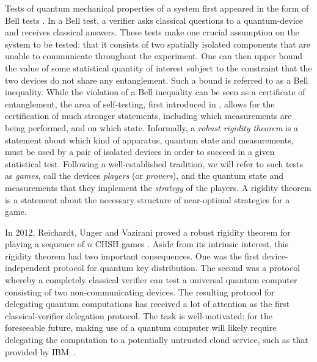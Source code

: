 \documentclass{toc}
\begin{document}
Tests of quantum mechanical properties of a system first appeared in the form of Bell tests \cite{Bell:64a,Clauser:69a}. In a Bell test, a verifier asks classical questions to a quantum-device and receives classical answers. These tests make one crucial assumption on the system to be tested: that it consists of two spatially isolated components that are unable to communicate throughout the experiment. One can then upper bound the value of some statistical quantity of interest subject to the constraint that the two devices do not share any entanglement. Such a bound is referred to as a Bell inequality. While the violation of a Bell inequality can be seen as a certificate of entanglement, the area of self-testing, first introduced in \cite{mayers2004selftesting}, allows for the certification of much stronger statements, including  which measurements are being performed, and on which state.  Informally, a \emph{robust rigidity theorem} is a statement about which kind of apparatus, quantum state and measurements, must be used by a pair of isolated devices in order to succeed in a given statistical test. Following a well-established tradition, we will refer to such tests as \emph{games}, call the devices \emph{players} (or \emph{provers}), and the quantum state and measurements that they implement the \emph{strategy} of the players. A rigidity theorem is a statement about the necessary structure of near-optimal strategies for a game.  

In 2012, Reichardt, Unger and Vazirani proved a robust rigidity theorem for
playing a sequence of $n$ CHSH games \cite{reichardt2012classical}. Aside from
its intrinsic interest, this rigidity theorem had two important consequences.
One was the first device-independent protocol for quantum key distribution. The
second was a protocol whereby a completely classical verifier can test a
universal quantum computer consisting of two non-communicating devices.  The resulting
 protocol for delegating quantum
computations has received a lot of attention as the first classical-verifier delegation protocol. 
The task is well-motivated: for the foreseeable future, making use of a quantum computer will likely require delegating the computation to a potentially untrusted cloud service, such as that provided by IBM~\cite{ibmcloud}.  
\end{document}
